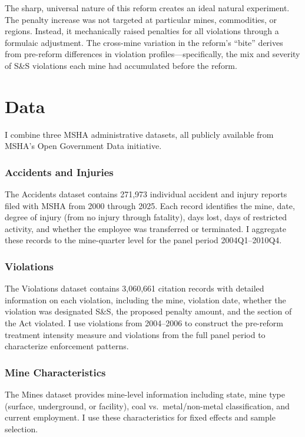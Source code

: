\documentclass[12pt]{article}
\begin{document}
The sharp, universal nature of this reform creates an ideal natural experiment. The penalty increase was not targeted at particular mines, commodities, or regions. Instead, it mechanically raised penalties for all violations through a formulaic adjustment. The cross-mine variation in the reform's ``bite'' derives from pre-reform differences in violation profiles---specifically, the mix and severity of S\&S violations each mine had accumulated before the reform.


\section{Data}

I combine three MSHA administrative datasets, all publicly available from MSHA's Open Government Data initiative.

\subsubsection*{Accidents and Injuries} The Accidents dataset contains 271,973 individual accident and injury reports filed with MSHA from 2000 through 2025. Each record identifies the mine, date, degree of injury (from no injury through fatality), days lost, days of restricted activity, and whether the employee was transferred or terminated. I aggregate these records to the mine-quarter level for the panel period 2004Q1--2010Q4.

\subsubsection*{Violations} The Violations dataset contains 3,060,661 citation records with detailed information on each violation, including the mine, violation date, whether the violation was designated S\&S, the proposed penalty amount, and the section of the Act violated. I use violations from 2004--2006 to construct the pre-reform treatment intensity measure and violations from the full panel period to characterize enforcement patterns.

\subsubsection*{Mine Characteristics} The Mines dataset provides mine-level information including state, mine type (surface, underground, or facility), coal vs.\ metal/non-metal classification, and current employment. I use these characteristics for fixed effects and sample selection.
\end{document}
